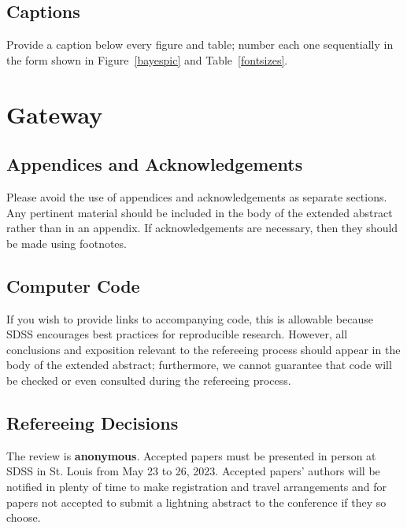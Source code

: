 \documentclass[10pt]{article}
\begin{document}
\subsection{Captions}
Provide a caption below every figure and table; number each one
sequentially in the form shown in Figure~\ref{bayespic} and
Table~\ref{fontsizes}.

\section{Gateway}

\subsection{Appendices and Acknowledgements}

Please avoid the use of appendices and acknowledgements
as separate sections.  Any pertinent material should be included in the
body of the extended abstract rather than in an appendix.  If
acknowledgements are necessary, then they should be made using footnotes.

\subsection{Computer Code}

If you wish to provide links to accompanying code, this is allowable because
SDSS encourages best practices for reproducible research.  However, all
conclusions and exposition relevant to the refereeing process should appear in
the body of the extended abstract; furthermore, we cannot guarantee that
code will be checked or even consulted during the refereeing process.

\subsection{Refereeing Decisions}
The review is \textbf{anonymous}. Accepted papers must be presented in person at SDSS in St. Louis
from May 23 to 26, 2023.
Accepted papers' authors will be notified in plenty of time to make registration and travel
arrangements and for papers not accepted to submit a lightning abstract to the
conference if they so choose.

\section{}


\end{document}
